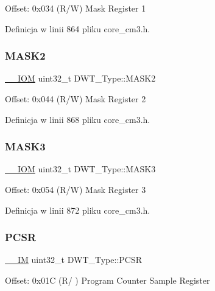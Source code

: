 Offset\+: 0x034 (R/W) Mask Register 1 

Definicja w linii 864 pliku core\+\_\+cm3.\+h.

\mbox{\label{struct_d_w_t___type_a00ac4d830dfe0070a656cda9baed170f}} 
\subsubsection{\texorpdfstring{M\+A\+S\+K2}{MASK2}}
{\footnotesize\ttfamily \hyperlink{core__sc300_8h_ab6caba5853a60a17e8e04499b52bf691}{\+\_\+\+\_\+\+I\+OM} uint32\+\_\+t D\+W\+T\+\_\+\+Type\+::\+M\+A\+S\+K2}

Offset\+: 0x044 (R/W) Mask Register 2 

Definicja w linii 868 pliku core\+\_\+cm3.\+h.

\mbox{\label{struct_d_w_t___type_a2a509d8505c37a3b64f6b24993df5f3f}} 
\subsubsection{\texorpdfstring{M\+A\+S\+K3}{MASK3}}
{\footnotesize\ttfamily \hyperlink{core__sc300_8h_ab6caba5853a60a17e8e04499b52bf691}{\+\_\+\+\_\+\+I\+OM} uint32\+\_\+t D\+W\+T\+\_\+\+Type\+::\+M\+A\+S\+K3}

Offset\+: 0x054 (R/W) Mask Register 3 

Definicja w linii 872 pliku core\+\_\+cm3.\+h.

\mbox{\label{struct_d_w_t___type_a6353ca1d1ad9bc1be05d3b5632960113}} 
\subsubsection{\texorpdfstring{P\+C\+SR}{PCSR}}
{\footnotesize\ttfamily \hyperlink{core__sc300_8h_a4cc1649793116d7c2d8afce7a4ffce43}{\+\_\+\+\_\+\+IM} uint32\+\_\+t D\+W\+T\+\_\+\+Type\+::\+P\+C\+SR}

Offset\+: 0x01C (R/ ) Program Counter Sample Register 

